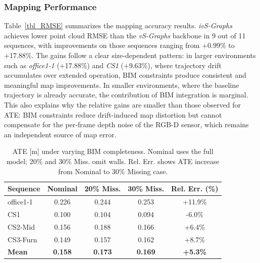 

\subsubsection{\textbf{Mapping Performance}}  
Table~\ref{tbl_RMSE} summarizes the mapping accuracy results. 
\textit{ivS-Graphs} achieves lower point cloud RMSE than the \textit{vS-Graphs} backbone in 9 out of 11 sequences, with improvements on those sequences ranging from +0.99\% to +17.88\%.
The gains follow a clear size-dependent pattern: in larger environments such as \textit{office1-1} (+17.88\%) and \textit{CS1} (+9.63\%), where trajectory drift accumulates over extended operation, BIM constraints produce consistent and meaningful map improvements. In smaller environments, where the baseline trajectory is already accurate, the contribution of BIM integration is marginal. This also explains why the relative gains are smaller than those observed for ATE: BIM constraints reduce drift-induced map distortion but cannot compensate for the per-frame depth noise of the RGB-D sensor, which remains an independent source of map error.




\begin{table}[b]
    \centering
    \caption{ATE [m] under varying BIM completeness. Nominal uses the full model; 20\% and 30\% Miss. omit walls. Rel. Err. shows ATE increase from Nominal to 30\% Missing case.}
    \label{tab:ate_missing_walls}
    \begin{tabular}{l|c|c|c|c}
    \toprule
    \textbf{Sequence} & \textbf{Nominal} & \textbf{20\% Miss.} & \textbf{30\% Miss.} & \textbf{Rel. Err. (\%)} \\
    \midrule
    office1-1 & 0.226 & 0.244 & 0.253 & +11.9\% \\
    CS1 & 0.100 & 0.104 & 0.094 & -6.0\% \\
    CS2-Mid & 0.156 & 0.188 & 0.166 & +6.4\% \\
    CS3-Furn & 0.149 & 0.157 & 0.162 & +8.7\% \\
    \midrule
    \textbf{Mean} & \textbf{0.158} & \textbf{0.173} & \textbf{0.169} & \textbf{+5.3\%} \\
    \bottomrule
    \end{tabular}
\end{table}

